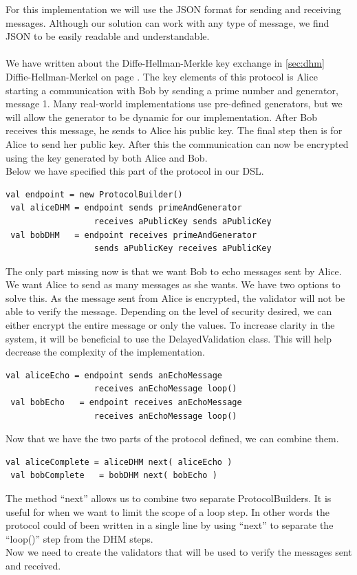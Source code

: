 For this implementation we will use the JSON format for sending and receiving messages. Although our solution can work with any type of message, we find JSON to be easily readable and understandable.
\\\\
We have written about the Diffe-Hellman-Merkle key exchange in \ref{sec:dhm} Diffie-Hellman-Merkel on page \pageref{sec:dhm}. The key elements of this protocol is Alice starting a communication with Bob by sending a prime number and generator, message 1. Many real-world implementations use pre-defined generators, but we will allow the generator to be dynamic for our implementation. After Bob receives this message, he sends to Alice his public key. The final step then is for Alice to send her public key. After this the communication can now be encrypted using the key generated by both Alice and Bob.
\\ 
Below we have specified this part of the protocol in our DSL.
\begin{lstlisting}[style=myScalastyle]
 val endpoint = new ProtocolBuilder()
 val aliceDHM = endpoint sends primeAndGenerator 
                  receives aPublicKey sends aPublicKey
 val bobDHM   = endpoint receives primeAndGenerator 
                  sends aPublicKey receives aPublicKey
\end{lstlisting}
The only part missing now is that we want Bob to echo messages sent by Alice. We want Alice to send as many messages as she wants. We have two options to solve this. As the message sent from Alice is encrypted, the validator will not be able to verify the message. Depending on the level of security desired, we can either encrypt the entire message or only the values. To increase clarity in the system, it will be beneficial to use the DelayedValidation class. This will help decrease the complexity of the implementation.

\begin{lstlisting}[style=myScalastyle]
 val aliceEcho = endpoint sends anEchoMessage 
                  receives anEchoMessage loop()
 val bobEcho   = endpoint receives anEchoMessage
                  receives anEchoMessage loop()
\end{lstlisting}

Now that we have the two parts of the protocol defined, we can combine them.
\begin{lstlisting}[style=myScalastyle]
 val aliceComplete = aliceDHM next( aliceEcho )
 val bobComplete   = bobDHM next( bobEcho )
\end{lstlisting}
The method ``next'' allows us to combine two separate ProtocolBuilders. It is useful for when we want to limit the scope of a loop step. In other words the protocol could of been written in a single line by using ``next'' to separate the ``loop()'' step from the DHM steps.
\\
Now we need to create the validators that will be used to verify the messages sent and received.

